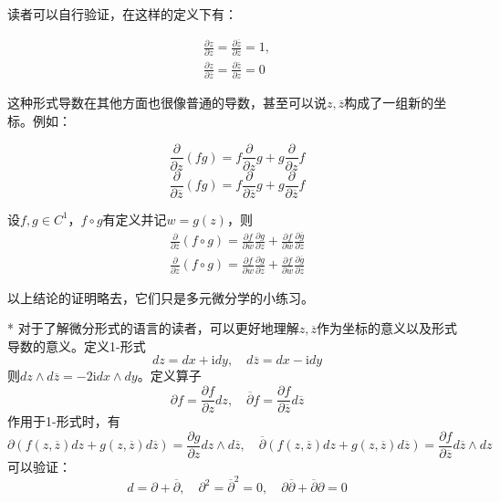 读者可以自行验证，在这样的定义下有：\begin{proposition}
    \begin{align*}
        \frac{\partial z}{\partial z}=\frac{\partial \overline{z}}{\partial \overline{z}}=1,\\
        \frac{\partial z}{\partial \overline{z}}=\frac{\partial \overline{z}}{\partial z}=0
    \end{align*}
\end{proposition}

这种形式导数在其他方面也很像普通的导数，甚至可以说$z,\overline{z}$构成了一组新的坐标。例如：
\begin{theorem}[莱布尼兹法则]
    \[\frac{\partial}{\partial z}(fg)=f\frac{\partial}{\partial z}g+g\frac{\partial}{\partial z}f\]
    \[\frac{\partial}{\partial \overline{z}}(fg)=f\frac{\partial}{\partial \overline{z}}g+g\frac{\partial}{\partial \overline{z}}f\]
\end{theorem}
\begin{theorem}[链式法则]
    设$f,g\in C^1$，$f\circ g$有定义并记$w=g(z)$，则
    \begin{align*}
        \frac{\partial}{\partial z}(f\circ g)=\frac{\partial f}{\partial w}\frac{\partial g}{\partial z}+\frac{\partial f}{\partial \overline{w}}\frac{\partial\overline{g}}{\partial z}\\
        \frac{\partial}{\partial \overline{z}}(f\circ g)=\frac{\partial f}{\partial w}\frac{\partial g}{\partial \overline{z}}+\frac{\partial f}{\partial \overline{w}}\frac{\partial\overline{g}}{\partial \overline{z}}
    \end{align*}
\end{theorem}
以上结论的证明略去，它们只是多元微分学的小练习。
\begin{remark}*
    对于了解微分形式的语言的读者，可以更好地理解$z,\overline{z}$作为坐标的意义以及形式导数的意义。定义1-形式\cite{shijihuai}
    $$dz=dx+\mathrm{i}dy,\quad d\overline{z}=dx-\mathrm{i}dy$$
    则$dz\wedge d\overline{z}=-2\mathrm{i} dx\wedge dy$。定义算子
    $$\partial f=\frac{\partial f}{\partial z}dz,\quad \overline{\partial} f=\frac{\partial f}{\partial \overline{z}}d\overline{z}$$
    作用于1-形式时，有
    $$\partial(f(z,\overline{z})dz+g(z,\overline{z})d\overline{z})=\frac{\partial g}{\partial z}dz\wedge d\overline{z},\quad \overline{\partial}(f(z,\overline{z})dz+g(z,\overline{z})d\overline{z})=\frac{\partial f}{\partial \overline{z}}d\overline{z}\wedge dz$$
    可以验证：$$d=\partial+\overline{\partial},\quad \partial^2=\overline{\partial}^2=0,\quad \partial\overline{\partial}+\overline{\partial}\partial=0$$
\end{remark}
